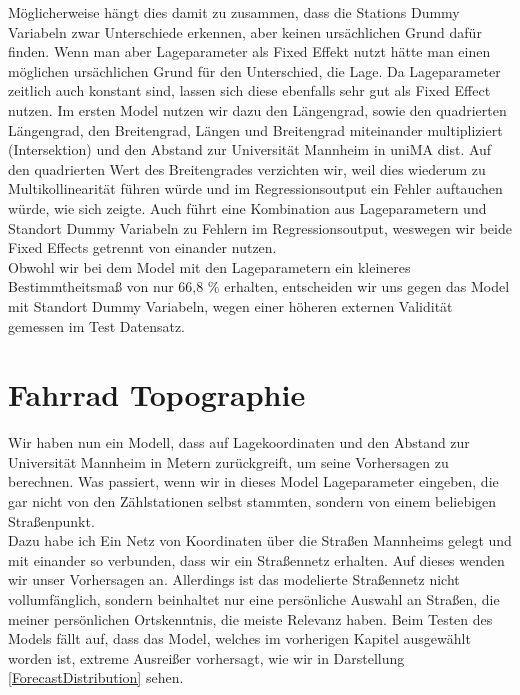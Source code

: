 \documentclass[a4paper,12pt]{thesis}
\begin{document}
Möglicherweise hängt dies damit zu zusammen, dass die Stations Dummy Variabeln zwar Unterschiede erkennen, aber keinen ursächlichen Grund dafür finden. Wenn man aber Lageparameter als Fixed Effekt nutzt hätte man einen möglichen ursächlichen Grund für den Unterschied, die Lage. Da Lageparameter zeitlich auch konstant sind, lassen sich diese ebenfalls sehr gut als Fixed Effect nutzen. Im ersten Model nutzen wir dazu den Längengrad, sowie den quadrierten Längengrad, den Breitengrad, Längen und Breitengrad miteinander multipliziert (Intersektion) und den Abstand zur Universität Mannheim in uniMA dist. Auf den quadrierten Wert des Breitengrades verzichten wir, weil dies wiederum zu Multikollinearität führen würde und im Regressionsoutput ein Fehler auftauchen würde, wie sich zeigte. Auch führt eine Kombination aus Lageparametern und Standort Dummy Variabeln zu Fehlern im Regressionsoutput, weswegen wir beide Fixed Effects getrennt von einander nutzen.\\

Obwohl wir bei dem Model mit den Lageparametern ein kleineres Bestimmtheitsmaß von nur 66,8 \% erhalten, entscheiden wir uns gegen das Model mit Standort Dummy Variabeln, wegen einer höheren externen Validität gemessen im Test Datensatz.

\section{Fahrrad Topographie}

Wir haben nun ein Modell, dass auf Lagekoordinaten und den Abstand zur Universität Mannheim in Metern zurückgreift, um seine Vorhersagen zu berechnen. Was passiert, wenn wir in dieses Model Lageparameter eingeben, die gar nicht von den Zählstationen selbst stammten, sondern von einem beliebigen Straßenpunkt.\\
Dazu habe ich Ein Netz von Koordinaten über die Straßen Mannheims gelegt und mit einander so verbunden, dass wir ein Straßennetz erhalten. Auf dieses wenden wir unser Vorhersagen an. Allerdings ist das modelierte Straßennetz nicht vollumfänglich, sondern beinhaltet nur eine persönliche Auswahl an Straßen, die meiner persönlichen Ortskenntnis, die meiste Relevanz haben. Beim Testen des Models fällt auf, dass das Model, welches im vorherigen Kapitel ausgewählt worden ist, extreme Ausreißer vorhersagt, wie wir in Darstellung \ref{ForecastDistribution} sehen. 
\end{document}
